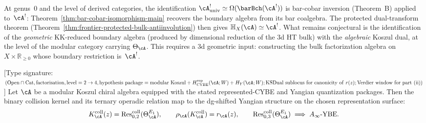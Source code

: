 \begin{remark}
\label{rem:boundary-defect-reduction}
At genus~$0$ and the level of derived categories, the identification
$\cA^!_{\mathrm{univ}} \simeq \Omega(\barBch(\cA^!))$ is
bar-cobar inversion (Theorem~B) applied to~$\cA^!$:
Theorem~\ref{thm:bar-cobar-isomorphism-main} recovers the
boundary algebra from its bar coalgebra.
The protected dual-transform theorem
\textup{(}Theorem~\textup{\ref{thm:frontier-protected-bulk-antiinvolution})}
then gives $\mathbb{H}_X(\cA) \simeq \cA^!$. What remains
conjectural is the identification of the \emph{geometric} KK-reduced
boundary algebra (produced by dimensional reduction of the 3d HT
bulk) with the \emph{algebraic} Koszul dual, at the level of the
modular category carrying $\Theta_\cA$. This requires a 3d
geometric input: constructing the bulk factorization algebra on
$X \times \mathbb{R}_{\geq 0}$ whose boundary restriction is~$\cA^!$.
\end{remark}

\begin{theorem}
\label{thm:yangian-shadow-theorem}
\textup{[}Type signature:
$(\mathrm{Open}\cap\mathrm{Cat},\mathrm{factorisation},
\mathrm{level}=2\to 4,
\mathrm{hypothesis\ package}=\mathrm{modular\ Koszul}
+H_{\mathrm{CYBE}}^{\mathrm{rep}}(\cA;W)+H_Y(\cA;W);
\mathrm{KSDual\ sublocus\ for\ canonicity\ of\ }r(z);
\mathrm{Verdier\ window\ for\ part\ (ii)})$\textup{]}
Let $\cA$ be a modular Koszul chiral algebra equipped with the stated
represented-CYBE and Yangian quantization packages. Then the binary
collision kernel and its ternary operadic relation map to the
dg-shifted Yangian structure on the chosen representation surface:
\begin{equation}\label{eq:yangian-shadow}
K_\cA^{\mathrm{coll}}(z)
=\operatorname{Res}^{\mathrm{coll}}_{0,2}(\Theta_\cA^{E_1}),
\qquad
\rho_\cA(K_\cA^{\mathrm{coll}})=r_\cA(z),
\qquad
\operatorname{Res}^{\mathrm{coll}}_{0,3}(\Theta_\cA^{E_1})
\;\Longrightarrow\;
A_\infty\text{-}\mathrm{YBE}.
\end{equation}
\end{theorem}

